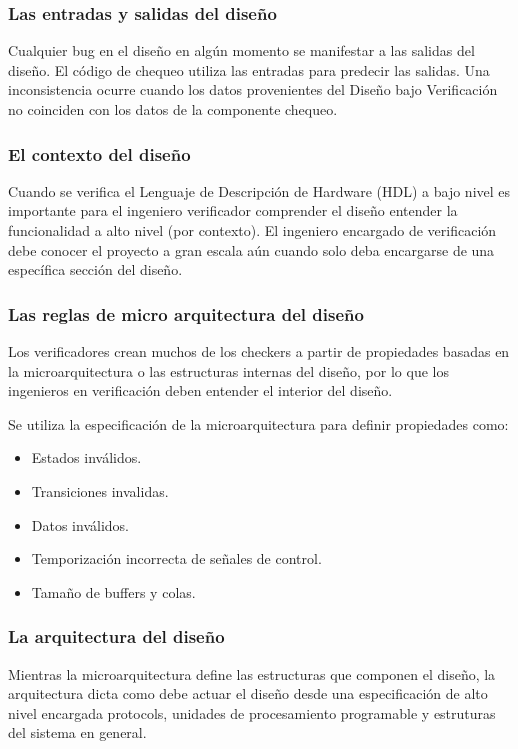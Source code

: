 \subsubsection{Las entradas y salidas del diseño} 

Cualquier bug en el diseño en algún momento se manifestar a las salidas del diseño. El código de chequeo utiliza las entradas para predecir las salidas. Una inconsistencia ocurre cuando los datos provenientes del  Diseño bajo Verificación no coinciden con los datos de la componente chequeo. 

\subsubsection{El contexto del diseño} 

Cuando se verifica el Lenguaje de Descripción de Hardware (HDL) a bajo nivel es importante para el ingeniero verificador comprender el diseño entender la funcionalidad a alto nivel (por contexto). El ingeniero encargado de verificación debe conocer el proyecto a gran escala aún cuando solo deba encargarse de una específica sección del diseño.

\subsubsection{Las reglas de micro arquitectura del diseño} 

Los verificadores crean muchos de los checkers a partir de propiedades basadas en la microarquitectura o las estructuras internas del diseño, por lo que los ingenieros en verificación deben entender el interior del diseño.  

Se utiliza la especificación de la microarquitectura para definir propiedades como:
\begin{itemize}
\item Estados inválidos.
\item Transiciones invalidas.
\item Datos inválidos.
\item Temporización incorrecta de señales de control.
\item Tamaño de buffers y colas.
\end{itemize}

\subsubsection{La arquitectura del diseño} 
Mientras la microarquitectura define las estructuras que componen el diseño, la arquitectura dicta como debe actuar el diseño desde una especificación de alto nivel encargada protocols, unidades de procesamiento programable y estruturas del sistema en general.